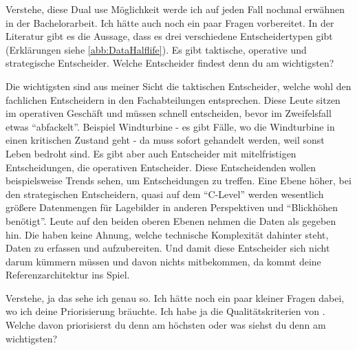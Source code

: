 \LF Verstehe, diese Dual use Möglichkeit werde ich auf jeden Fall nochmal erwähnen in der Bachelorarbeit. Ich hätte auch noch ein paar Fragen vorbereitet. In der Literatur gibt es die Aussage, dass es drei verschiedene Entscheidertypen gibt (Erklärungen siehe \autoref{abb:DataHalflife}). Es gibt taktische, operative und strategische Entscheider. Welche Entscheider findest denn du am wichtigsten?

\PE Die wichtigsten sind aus meiner Sicht die taktischen Entscheider, welche wohl den fachlichen Entscheidern in den Fachabteilungen entsprechen. Diese Leute sitzen im operativen Geschäft und müssen schnell entscheiden, bevor im Zweifelsfall etwas \enquote{abfackelt}. Beispiel Windturbine - es gibt Fälle, wo die Windturbine in einen kritischen Zustand geht - da muss sofort gehandelt werden, weil sonst Leben bedroht sind. Es gibt aber auch Entscheider mit mitelfristigen Entscheidungen, die operativen Entscheider. Diese Entscheidenden wollen beispielsweise Trends sehen, um Entscheidungen zu treffen. Eine Ebene höher, bei den strategischen Entscheidern, quasi auf dem \enquote{C-Level} werden wesentlich größere Datenmengen für Lagebilder in anderen Perspektiven und \enquote{Blickhöhen benötigt}. Leute auf den beiden oberen Ebenen nehmen die Daten als gegeben hin. Die haben keine Ahnung, welche technische Komplexität dahinter steht, Daten zu erfassen und aufzubereiten. Und damit diese Entscheider sich nicht darum kümmern müssen und davon nichts mitbekommen, da kommt deine Referenzarchitektur ins Spiel. 

\LF Verstehe, ja das sehe ich genau so. Ich hätte noch ein paar kleiner Fragen dabei, wo ich deine Priorisierung bräuchte. Ich habe ja die Qualitätskriterien von \citeauthor{Muller.2020}. Welche davon priorisierst du denn am höchsten oder was siehst du denn am wichtigsten?

